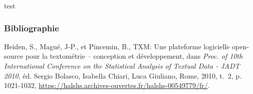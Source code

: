 \documentclass{beamer}
\begin{document}
\begin{frame}{test}

\end{frame}

\appendix

\begin{frame}[fragile]
\frametitle{Bibliographie} 

\begin{thebibliography}{Heiden et al., 2010}
	 Heiden, S., Magué, J-P., et Pincemin, B., \og{}TXM: Une plateforme logicielle open-source pour la textométrie – conception et développement\fg{}, dans \textit{Proc. of 10th International Conference on the Statistical Analysis of Textual Data - JADT 2010}, éd. Sergio Bolasco, Isabella Chiari, Luca Giuliano, Rome, 2010, t.~2, p. 1021-1032, \url{https://halshs.archives-ouvertes.fr/halshs-00549779/fr/}.
\end{thebibliography}


\end{frame}
\end{document}
